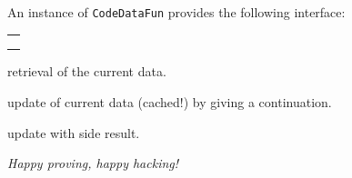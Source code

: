 \begin{isabellebody}
\begin{isamarkuptext}
\begin{description}
  \end{description}

  An instance of \verb|CodeDataFun| provides the following
  interface:

  \medskip
  \begin{tabular}{l}
  \isa{get{\isacharcolon}\ theory\ {\isasymrightarrow}\ T} \\
  \isa{change{\isacharcolon}\ theory\ {\isasymrightarrow}\ {\isacharparenleft}T\ {\isasymrightarrow}\ T{\isacharparenright}\ {\isasymrightarrow}\ T} \\
  \isa{change{\isacharunderscore}yield{\isacharcolon}\ theory\ {\isasymrightarrow}\ {\isacharparenleft}T\ {\isasymrightarrow}\ {\isacharprime}a\ {\isacharasterisk}\ T{\isacharparenright}\ {\isasymrightarrow}\ {\isacharprime}a\ {\isacharasterisk}\ T}
  \end{tabular}

  \begin{description}

  \item {} retrieval of the current data.

  \item {} update of current data (cached!)
    by giving a continuation.

  \item {} update with side result.

  \end{description}%
\end{isamarkuptext}%
\isamarkuptrue%
%
\begin{isamarkuptext}%
\emph{Happy proving, happy hacking!}%
\end{isamarkuptext}%
\isamarkuptrue%
%
\isadelimtheory
%
\endisadelimtheory
%
\isatagtheory
{}\isamarkupfalse%
%
\endisatagtheory
{\isafoldtheory}%
%
\isadelimtheory
%
\endisadelimtheory
\isanewline
\end{isabellebody}%

